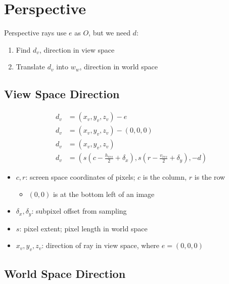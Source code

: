 \section{Perspective}

  Perspective rays use $ e $ as $ O $, but we need $ d $:

  \begin{enumerate}
    \item Find $ d_{v} $, direction in view space
    \item Translate $ d_{v} $ into $ w_{w} $, direction in world space
  \end{enumerate}

  \subsection{View Space Direction}

    \begin{align}
      d_{v} &= \left( x_{v}, y_{v}, z_{v} \right) - e \\
      d_{v} &= \left( x_{v}, y_{v}, z_{v} \right) - \left( 0, 0, 0 \right) \\
      d_{v} &= \left( x_{v}, y_{v}, z_{v} \right) \\
      d_{v} &=
      \left(
        s\left( c - \frac{h_{res}}{2} + \delta_{x} \right),
        s\left( r - \frac{v_{res}}{2} + \delta_{y} \right),
        -d
      \right)
    \end{align}

    \begin{itemize}
      \item $ c, r $: screen space coordinates of pixels; $ c $ is the column,
      $ r $ is the row
      \begin{itemize}
        \item $ \left( 0, 0 \right) $ is at the bottom left of an image
      \end{itemize}

      \item $ \delta_{x}, \delta_{y} $: subpixel offset from sampling
      \item $ s $: pixel extent; pixel length in world space
      \item $ x_{v}, y_{v}, z_{v} $: direction of ray in view space, where
      $ e = \left( 0, 0, 0 \right) $
    \end{itemize}

  \subsection{World Space Direction}


